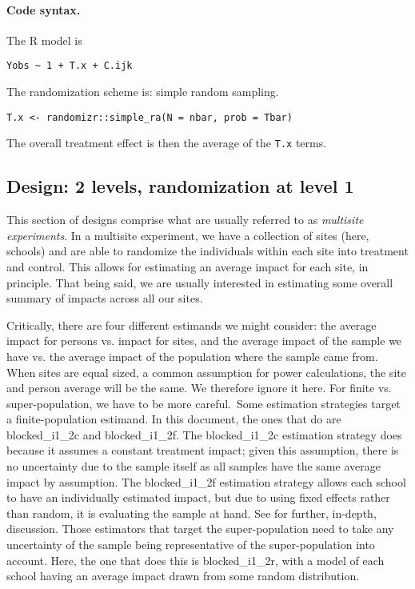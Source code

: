 \documentclass[12pt]{article}
\begin{document}
\paragraph{Code syntax.}
The R model is
\begin{verbatim}
Yobs ~ 1 + T.x + C.ijk
\end{verbatim}

The randomization scheme is: simple random sampling.
\begin{verbatim}
T.x <- randomizr::simple_ra(N = nbar, prob = Tbar)
\end{verbatim}

The overall treatment effect is then the average of the \texttt{T.x} terms.




\newpage
\subsection{Design: 2 levels, randomization at level 1}

This section of designs comprise what are usually referred to as \emph{multisite experiments}.
In a multisite experiment, we have a collection of sites (here, schools) and are able to randomize the individuals within each site into treatment and control.
This allows for estimating an average impact for each site, in principle.
That being said, we are usually interested in estimating some overall summary of impacts across all our sites.

Critically, there are four different estimands we might consider: the average impact for persons vs. impact for sites, and the average impact of the sample we have vs. the average impact of the population where the sample came from.
When sites are equal sized, a common assumption for power calculations, the site and person average will be the same.
We therefore ignore it here.
For finite vs. super-population, we have to be more careful.\
Some estimation strategies target a finite-population estimand.
In this document, the ones that do are blocked\_i1\_2c and blocked\_i1\_2f.
The blocked\_i1\_2c estimation strategy does because it assumes a constant treatment impact; given this assumption, there is no uncertainty due to the sample itself as all samples have the same average impact by assumption.
The blocked\_i1\_2f estimation strategy allows each school to have an individually estimated impact, but due to using fixed effects rather than random, it is evaluating the sample at hand.
See \citet{Miratrix2020} for further, in-depth, discussion.
Those estimators that target the super-population need to take any uncertainty of the sample being representative of the super-population into account.
Here, the one that does this is blocked\_i1\_2r, with a model of each school having an average impact drawn from some random distribution.
\end{document}
